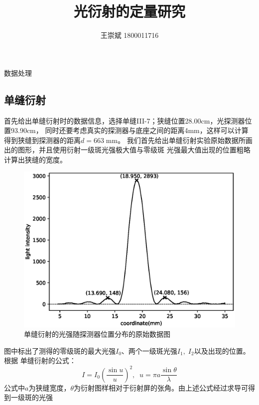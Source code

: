 \documentclass[a4paper]{ctexart}
\title{\textbf{光衍射的定量研究}}
\author{王崇斌 1800011716}
\date{}
\makeatletter
\def\mm{\mathrm{mm}}
\renewcommand{\section}{\@startsection{section}{1}{0mm}
	{-\baselineskip}{0.5\baselineskip}{\bf\leftline}}
\makeatother
\begin{document}
	\pagestyle{fancy}
	\chead{}
	\rhead{}
	\maketitle
    \thispagestyle{fancy}
    \section{\large{数据处理}}
    \subsection{单缝衍射}
    \par 
    首先给出单缝衍射时的数据信息，选择单缝III-7；狭缝位置28.00cm，光探测器位置93.90cm，
    同时还要考虑真实的探测器与底座之间的距离4mm，这样可以计算得到狭缝到探测器的距离$d=663\;\mm$。
    我们首先给出单缝衍射实验原始数据所画出的图形，并且使用衍射一级斑光强极大值与零级斑
    光强最大值出现的位置粗略计算出狭缝的宽度。
    \begin{figure}[htbp]
        \centering
        \includegraphics[scale=0.8]{image/single_original.eps}
        \caption{单缝衍射的光强随探测器位置分布的原始数据图}
    \end{figure}
    \par 
    图中标出了测得的零级斑的最大光强$I_{0}$、两个一级斑光强$I_{1},\;I_{2}$以及出现的位置。根据
    单缝衍射的公式：
    \begin{equation}
    I = I_{0} \left(\frac{\sin u}{u}\right)^{2},\;\; u = \pi a\frac{\sin \theta}{\lambda}
    \end{equation}
    公式中$a$为狭缝宽度，$\theta$为衍射图样相对于衍射屏的张角。由上述公式经过求导可得到一级斑的光强
\end{document}
